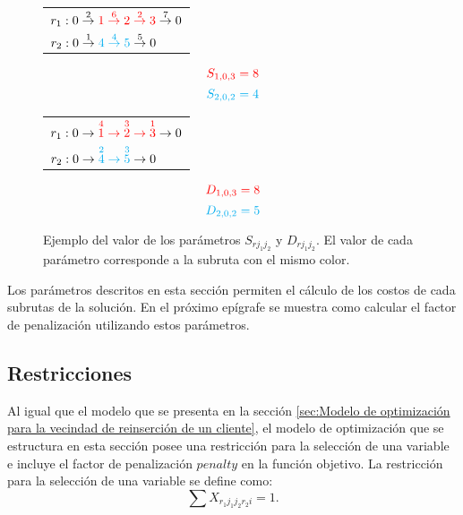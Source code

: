 \documentclass[12pt]{report}
\begin{document}
	\begin{figure}[!h]
		\centering
		\begin{minipage}{0.45\textwidth}
			\begin{tabular}{l}
				$r_1: 0 \overset{2}{\rightarrow} \textcolor{red}{1 \overset{6}{\rightarrow} 2 \overset{2}{\rightarrow} 3} \overset{7}{\rightarrow} 0$\\
				$r_2: 0\overset{1}{\rightarrow} \textcolor{cyan}{4 \overset{4}{\rightarrow} 5} \overset{5}{\rightarrow} 0$
			\end{tabular}
		\end{minipage}
		\hfill
		\begin{minipage}{0.45\textwidth}
			\[ \textcolor{red}{S_{1,0,3} = 8} \]
			\[ \textcolor{cyan}{S_{2,0,2} = 4} \]
		\end{minipage}
		\vspace{0.5cm}
		\vfill
		\begin{minipage}{0.45\textwidth}
			\begin{tabular}{l}
				$r_1: 0 \rightarrow\textcolor{red}{\overset{4}{1} \rightarrow \overset{3}{2} \rightarrow \overset{1}{3}} \rightarrow 0$\\
				$r_2: 0 \rightarrow \textcolor{cyan}{\overset{2}{4} \rightarrow \overset{3}{5}} \rightarrow 0$
			\end{tabular}
		\end{minipage}
		\hfill
		\begin{minipage}{0.45\textwidth}
			\[ \textcolor{red}{D_{1,0,3} = 8} \]
			\[ \textcolor{cyan}{D_{2,0,2} = 5} \]
		\end{minipage}


		\caption {Ejemplo del valor de los parámetros $S_{rj_1j_2}$ y $D_{rj_1j_2}$. El valor de cada parámetro corresponde a la subruta con el mismo color.}
		\label{fig:Valor de parametros}
              \end{figure}


	Los parámetros descritos en esta sección permiten el cálculo de los costos de cada subrutas de la solución. En el próximo epígrafe se muestra como calcular el factor de penalización utilizando estos parámetros.

	\subsection{Restricciones}
	Al igual que el modelo que se presenta en la sección \ref{sec:Modelo de optimización para la vecindad de reinserción de un cliente}, el modelo de optimización que se estructura en esta sección posee una restricción para la selección de una variable e incluye el factor de penalización $penalty$ en la función objetivo. La restricción para la selección de una variable se define como:
	\[
	\sum  X_{r_1j_1j_2r_2i} = 1.
	\]
\end{document}
